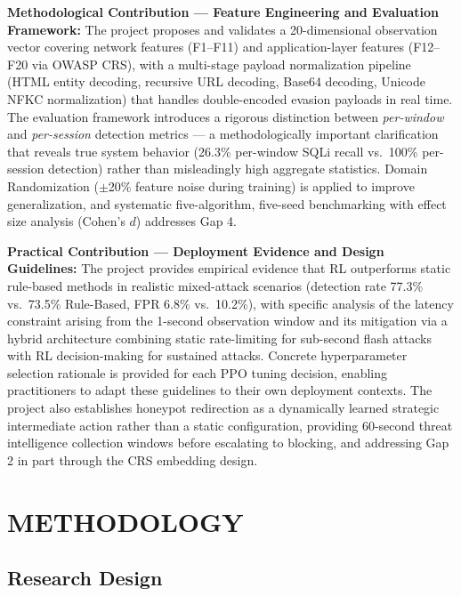 \documentclass[12pt,a4paper]{report}
\begin{document}
\textbf{Methodological Contribution --- Feature Engineering and Evaluation Framework:} The project proposes and validates a 20-dimensional observation vector covering network features (F1--F11) and application-layer features (F12--F20 via OWASP CRS), with a multi-stage payload normalization pipeline (HTML entity decoding, recursive URL decoding, Base64 decoding, Unicode NFKC normalization) that handles double-encoded evasion payloads in real time. The evaluation framework introduces a rigorous distinction between \textit{per-window} and \textit{per-session} detection metrics --- a methodologically important clarification that reveals true system behavior (26.3\% per-window SQLi recall vs.\ 100\% per-session detection) rather than misleadingly high aggregate statistics. Domain Randomization ($\pm$20\% feature noise during training) is applied to improve generalization, and systematic five-algorithm, five-seed benchmarking with effect size analysis (Cohen's $d$) addresses Gap 4.

\textbf{Practical Contribution --- Deployment Evidence and Design Guidelines:} The project provides empirical evidence that RL outperforms static rule-based methods in realistic mixed-attack scenarios (detection rate 77.3\% vs.\ 73.5\% Rule-Based, FPR 6.8\% vs.\ 10.2\%), with specific analysis of the latency constraint arising from the 1-second observation window and its mitigation via a hybrid architecture combining static rate-limiting for sub-second flash attacks with RL decision-making for sustained attacks. Concrete hyperparameter selection rationale is provided for each PPO tuning decision, enabling practitioners to adapt these guidelines to their own deployment contexts. The project also establishes honeypot redirection as a dynamically learned strategic intermediate action rather than a static configuration, providing 60-second threat intelligence collection windows before escalating to blocking, and addressing Gap 2 in part through the CRS embedding design.

\chapter{METHODOLOGY}

\section{Research Design}
\end{document}
